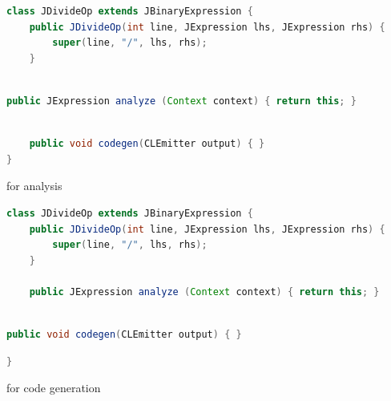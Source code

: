 \documentclass[8pt,a4paper,compress]{beamer}
\begin{document}
\begin{frame}[fragile]
\begin{overprint}
\begin{tcolorbox}[enhanced,drop shadow southwest,sharp corners,size=fbox,colback=white,fontlower=\small\ttfamily,collower=silver900]

\begin{lstlisting}[language=Java,style=focusin]
class JDivideOp extends JBinaryExpression {
    public JDivideOp(int line, JExpression lhs, JExpression rhs) {
        super(line, "/", lhs, rhs);
    }
 
\end{lstlisting}
\begin{lstlisting}[language=Java,style=focusin,backgroundcolor=\color{lime100}]
    public JExpression analyze (Context context) { return this; }
\end{lstlisting}
\begin{lstlisting}[language=Java,style=focusin]
    
    public void codegen(CLEmitter output) { }
}
\end{lstlisting}

\tcblower
\begin{minipage}[t][.2cm][t]{\textwidth}
for analysis
\end{minipage}
\end{tcolorbox}

\begin{tcolorbox}[enhanced,drop shadow southwest,sharp corners,size=fbox,colback=white,fontlower=\small\ttfamily,collower=silver900]

\begin{lstlisting}[language=Java,style=focusin]
class JDivideOp extends JBinaryExpression {
    public JDivideOp(int line, JExpression lhs, JExpression rhs) {
        super(line, "/", lhs, rhs);
    }
 
    public JExpression analyze (Context context) { return this; }
    
\end{lstlisting}
\begin{lstlisting}[language=Java,style=focusin,backgroundcolor=\color{lime100}]
    public void codegen(CLEmitter output) { }
\end{lstlisting}
\begin{lstlisting}[language=Java,style=focusin]
}
\end{lstlisting}

\tcblower
\begin{minipage}[t][.2cm][t]{\textwidth}
for code generation
\end{minipage}
\end{tcolorbox}
\end{overprint}
\end{frame}
\end{document}
